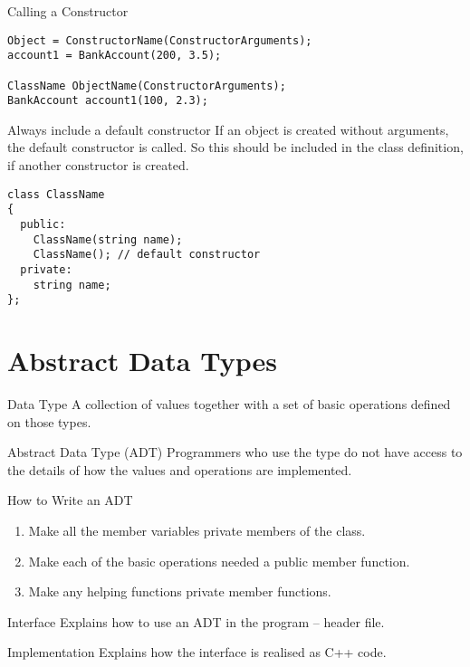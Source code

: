 \documentclass[\main/notes.tex]{subfiles}
\begin{document}
			\begin{codebox}{Calling a Constructor}
				\begin{verbatim}
Object = ConstructorName(ConstructorArguments);
account1 = BankAccount(200, 3.5);

ClassName ObjectName(ConstructorArguments);
BankAccount account1(100, 2.3);
				\end{verbatim}
			\end{codebox}
			\begin{sidenote}{Always include a default constructor}
				If an object is created without arguments, the default constructor is called. So this should be included in the class definition, if another constructor is created.
				\begin{verbatim}
class ClassName
{
  public:
    ClassName(string name);
    ClassName(); // default constructor
  private:
    string name;
};
				\end{verbatim}
			\end{sidenote}

		\section{Abstract Data Types}
			\begin{definition}{Data Type}
				A collection of values together with a set of basic operations defined on those types.
			\end{definition}
			\begin{definition}{Abstract Data Type (ADT)}
				Programmers who use the type do not have access to the details of how the values and operations are implemented.
			\end{definition}
			\begin{sidenote}{How to Write an ADT}
				\begin{enumerate}[nosep]
					\item Make all the member variables private members of the class.
					\item Make each of the basic operations needed a public member function.
					\item Make any helping functions private member functions.
				\end{enumerate}
			\end{sidenote}
			\begin{sidenote}{Interface}
				Explains how to use an ADT in the program -- header file.
			\end{sidenote}
			\begin{sidenote}{Implementation}
				Explains how the interface is realised as C++ code.
			\end{sidenote}
\end{document}
